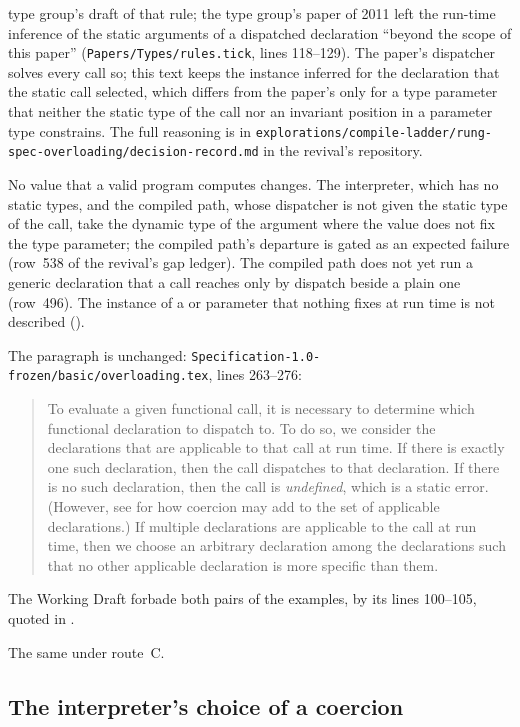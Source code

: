 \begin{description}
type group's draft of that rule; the type group's paper of 2011 left the
run-time inference of the static arguments of a dispatched declaration ``beyond
the scope of this paper'' (\nolinkurl{Papers/Types/rules.tick}, lines 118--129).
The paper's dispatcher solves every call so; this text keeps the instance
inferred for the declaration that the static call selected, which differs from
the paper's only for a type parameter that neither the static type of the call
nor an invariant position in a parameter type constrains.
The full reasoning is in
\nolinkurl{explorations/compile-ladder/rung-spec-overloading/decision-record.md}
in the revival's repository.
\item[Effect] No value that a valid program computes changes.
The interpreter, which has no static types, and the compiled path, whose
dispatcher is not given the static type of the call, take the dynamic type of
the argument where the value does not fix the type parameter; the compiled
path's departure is gated as an expected failure (row~538 of the revival's gap
ledger).
The compiled path does not yet run a generic declaration that a call reaches
only by dispatch beside a plain one (row~496).
The instance of a  or  parameter that nothing fixes at run
time is not described ().
\item[Original text] The paragraph is unchanged:
\nolinkurl{Specification-1.0-frozen/basic/overloading.tex}, lines 263--276:
\begin{quote}
To evaluate a given functional call, it is necessary to determine which
functional declaration to dispatch to.
To do so, we consider the declarations that are applicable to that call at run
time.
If there is exactly one such declaration, then the call dispatches to that
declaration.
If there is no such declaration, then the call is \emph{undefined}, which is a
static error.
(However, see  for how coercion may add to
the set of applicable declarations.)
If multiple declarations are applicable to the call at run time, then we choose
an arbitrary declaration among the declarations such that no other applicable
declaration is more specific than them.
\end{quote}
The Working Draft forbade both pairs of the examples, by its lines 100--105,
quoted in .
\item[Route C] The same under route~C.
\end{description}

\subsection{The interpreter's choice of a coercion}

